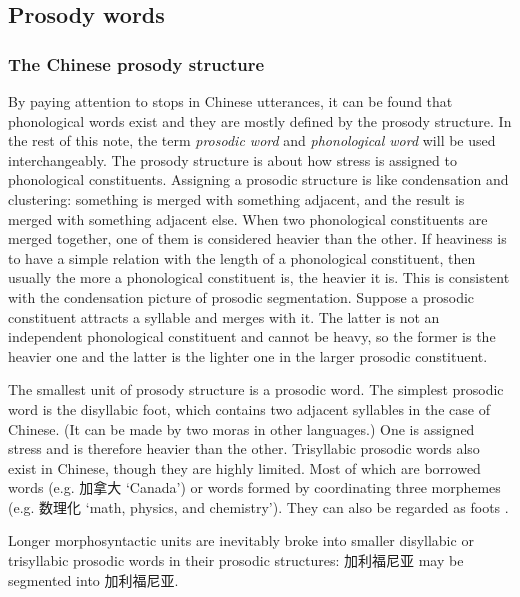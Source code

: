 \documentclass[UTF8, a4paper, oneside, scheme=plain]{ctexart}
\newcommand*{\citesec}[1]{\S~{#1}}
\newcommand*{\term}[1]{\emph{#1}}
\newcommand{\translate}[1]{`#1'}
\begin{document}
\subsection{Prosody words}

\subsubsection{The Chinese prosody structure}\label{sec:prosody-structure}

By paying attention to stops in Chinese utterances,
it can be found that phonological words exist and they are mostly defined by the prosody structure.
In the rest of this note,
the term \term{prosodic word} and \term{phonological word}
will be used interchangeably.
The prosody structure is about how stress is assigned to phonological constituents.
Assigning a prosodic structure is like condensation and clustering:
something is merged with something adjacent,
and the result is merged with something adjacent else.
When two phonological constituents are merged together,
one of them is considered heavier than the other.
If heaviness is to have a simple relation with the length of a phonological constituent,
then usually the more a phonological constituent is,
the heavier it is.
This is consistent with the condensation picture of prosodic segmentation.
Suppose a prosodic constituent attracts a syllable and merges with it.
The latter is not an independent phonological constituent
and cannot be heavy,
so the former is the heavier one and the latter is the lighter one in the larger prosodic constituent.

The smallest unit of prosody structure 
is a prosodic word.
The simplest prosodic word is the disyllabic foot, 
which contains two adjacent syllables in the case of Chinese.
(It can be made by two moras in other languages.)
One is assigned stress and is therefore heavier than the other.
Trisyllabic prosodic words also exist in Chinese,
though they are highly limited.
Most of which are borrowed words (e.g. 加拿大 \translate{Canada})
or words formed by coordinating three morphemes (e.g. 数理化 \translate{math, physics, and chemistry}).
They can also be regarded as foots \citet[\citesec{2.2}]{feng2000}.

Longer morphosyntactic units are inevitably broke into smaller disyllabic or trisyllabic prosodic words
in their prosodic structures:
加利福尼亚 may be segmented into 加利\textbar 福尼亚.
\end{document}
